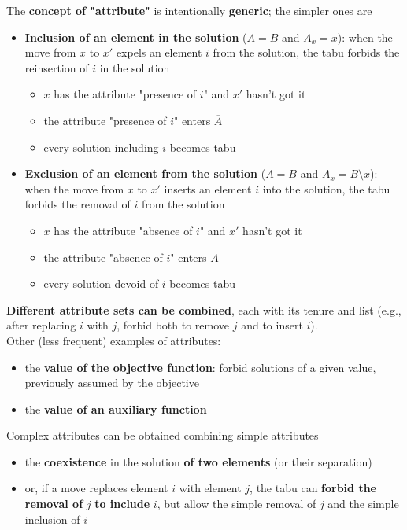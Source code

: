 \newpage

The \textbf{concept of "attribute"} is intentionally \textbf{generic}; the simpler ones are
\begin{itemize}
	\item \textbf{Inclusion of an element in the solution} ($A = B$ and $A_x = x$): when the move from $x$ to $x'$ expels an element $i$ from the solution, the tabu forbids the reinsertion of $i$ in the solution
	\begin{itemize}
		\item $x$ has the attribute "presence of $i$" and $x'$ hasn't got it
		\item the attribute "presence of $i$" enters $\overline{A}$
		\item every solution including $i$ becomes tabu
	\end{itemize}
	\nn
	
	\item \textbf{Exclusion of an element from the solution} ($A = B$ and $A_x = B \setminus x$): when the move from $x$ to $x'$ inserts an element $i$ into the solution, the tabu forbids the removal of $i$ from the solution
	\begin{itemize}
		\item $x$ has the attribute "absence of $i$" and $x'$ hasn't got it
		\item the attribute "absence of $i$" enters $\overline{A}$
		\item every solution devoid of $i$ becomes tabu
	\end{itemize}
	\nn
\end{itemize}

\textbf{Different attribute sets can be combined}, each with its tenure and list (e.g., after replacing $i$ with $j$, forbid both to remove $j$ and to insert $i$).\\

Other (less frequent) examples of attributes:
\begin{itemize}
	\item the \textbf{value of the objective function}: forbid solutions of a given value, previously assumed by the objective
	\item the \textbf{value of an auxiliary function}
\end{itemize}

Complex attributes can be obtained combining simple attributes
\begin{itemize}
	\item the \textbf{coexistence} in the solution \textbf{of two elements} (or their separation) 
	\item or, if a move replaces element $i$ with element $j$, the tabu can \textbf{forbid the removal of} $j$ \textbf{to include} $i$, but allow the simple removal of $j$ and the simple inclusion of $i$
\end{itemize}

